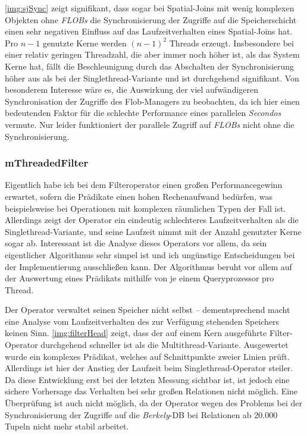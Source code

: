 \documentclass[a4paper,12pt,twoside]{article}
\newcommand{\Fb}[1]{\textit{#1}} %
\begin{document}
\autoref{img:sjSync} zeigt signifikant, dass sogar bei Spatial-Joins mit wenig komplexen Objekten ohne \Fb{FLOBs} die Synchronisierung der Zugriffe auf die Speicherschicht einen sehr negativen Einfluss auf das Laufzeitverhalten eines Spatial-Joins hat. Pro $n-1$ genutzte Kerne werden $(n-1)^2$ Threads erzeugt. Insbesondere bei einer relativ geringen Threadzahl, die aber immer noch höher ist, als das System Kerne hat, fällt die Beschleunigung durch das Abschalten der Synchronisierung höher aus als bei der Singlethread-Variante und ist durchgehend signifikant. Von besonderem Interesse wäre es, die Auswirkung der viel aufwändigeren Synchronisation der Zugriffe des Flob-Managers zu beobachten, da ich hier einen bedeutenden Faktor für die schlechte Performance eines parallelen \Fb{Secondos} vermute. Nur leider funktioniert der parallele Zugriff auf \Fb{FLOBs} nicht ohne die Synchronisierung.   

\subsubsection{mThreadedFilter}
\label{entw:filter}

Eigentlich habe ich bei dem Filteroperator einen großen Performancegewinn erwartet, sofern die Prädikate einen hohen Rechenaufwand bedürfen, was beispielsweise bei Operationen mit komplexen räumlichen Typen der Fall ist. Allerdings zeigt der Operator ein eindeutig schlechteres Laufzeitverhalten als die Singlethread-Variante, und seine Laufzeit nimmt mit der Anzahl genutzter Kerne sogar ab. Interessant ist die Analyse dieses Operators vor allem, da sein eigentlicher Algorithmus sehr simpel ist und ich ungünstige Entscheidungen bei der Implementierung ausschließen kann. Der Algorithmus beruht vor allem auf der Auswertung eines Prädikats mithilfe von je einem Queryprozessor pro Thread.
  
Der Operator verwaltet seinen Speicher nicht selbst -- dementsprechend macht eine Analyse vom Laufzeitverhalten des zur Verfügung stehenden Speichers keinen Sinn. \autoref{img:filterHead} zeigt, dass der auf einem Kern ausgeführte Filter-Operator durchgehend schneller ist als die Multithread-Variante. Ausgewertet wurde ein komplexes Prädikat, welches auf Schnittpunkte zweier Linien prüft. Allerdings ist hier der Anstieg der Laufzeit beim Singlethread-Operator steiler. Da diese Entwicklung erst bei der letzten Messung sichtbar ist, ist jedoch eine sichere Vorhersage das Verhalten bei sehr großen Relationen nicht möglich. Eine Überprüfung ist auch nicht möglich, da der Operator wegen des Problems bei der Synchronisierung der Zugriffe auf die \Fb{Berkely}-DB bei Relationen ab 20.000 Tupeln nicht mehr stabil arbeitet. 
\end{document}
